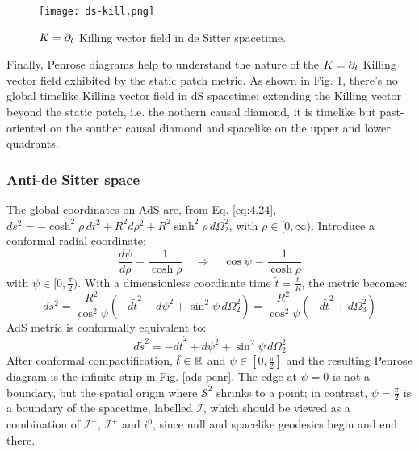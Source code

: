 \begin{figure}
  \centering
  \texttt{[image: ds-kill.png]}
  \caption{$ K = \partial_t $ Killing vector field in de Sitter spacetime.}
  \label{ds-kill}
\end{figure}

Finally, Penrose diagrams help to understand the nature of the $ K = \partial_t $ Killing vector field exhibited by the static patch metric. As shown in Fig. \ref{ds-kill}, there's no global timelike Killing vector field in dS spacetime: extending the Killing vector beyond the static patch, i.e. the nothern causal diamond, it is timelike but past-oriented on the souther causal diamond and spacelike on the upper and lower quadrants.

\subsubsection{Anti-de Sitter space}

The global coordinates on AdS are, from Eq. \ref{eq:4.24}, $ ds^2 = - \cosh^2 \rho \, dt^2 + R^2 d\rho^2 + R^2 \sinh^2 \rho \, d\Omega_2^2 $, with $ \rho \in [0,\infty) $. Introduce a conformal radial coordinate:
\begin{equation*}
  \frac{d\psi}{d\rho} = \frac{1}{\cosh \rho}
  \quad \Rightarrow \quad
  \cos \psi = \frac{1}{\cosh \rho}
\end{equation*}
with $ \psi \in [0, \frac{\pi}{2}) $. With a dimensionless coordiante time $ \tilde{t} = \frac{t}{R} $, the metric becomes:
\begin{equation*}
  ds^2 = \frac{R^2}{\cos^2 \psi} \left( -d\tilde{t}^2 + d\psi^2 + \sin^2 \psi \, d\Omega_2^2 \right) = \frac{R^2}{\cos^2 \psi} \left( -d\tilde{t}^2 + d\Omega_3^2 \right)
\end{equation*}
AdS metric is conformally equivalent to:
\begin{equation*}
  d\tilde{s}^2 = -d\tilde{t}^2 + d\psi^2 + \sin^2 \psi \, d\Omega_2^2
\end{equation*}
After conformal compactification, $ \tilde{t} \in \mathbb{R} $ and $ \psi \in \left[ 0, \frac{\pi}{2} \right] $ and the resulting Penrose diagram is the infinite strip in Fig. \ref{ads-penr}. The edge at $ \psi = 0 $ is not a boundary, but the spatial origin where $ \mathcal{S}^2 $ shrinks to a point; in contrast, $ \psi = \frac{\pi}{2} $ is a boundary of the spacetime, labelled $ \mathcal{I} $, which should be viewed as a combination of $ \mathcal{I}^- $, $ \mathcal{I}^+ $ and $ i^0 $, since null and spacelike geodesics begin and end there.


